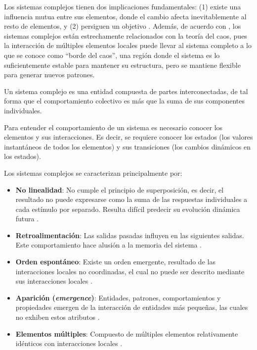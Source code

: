 Los sistemas complejos tienen dos implicaciones fundamentales: (1) existe una influencia mutua entre sus elementos, donde el cambio afecta inevitablemente al resto de elementos, y (2) persiguen un objetivo \cite{Zelinka2018_cs}. Además, de acuerdo con \cite{sole1996_cs_caos}, los sistemas complejos están estrechamente relacionados con la teoría del caos, pues la interacción de múltiples elementos locales puede llevar al sistema completo a lo que se conoce como ``borde del caos'', una región donde el sistema es lo suficientemente estable para mantener su estructura, pero se mantiene flexible para generar nuevos patrones.

\begin{definition}
	Un sistema complejo es una entidad compuesta de partes interconectadas, de tal forma que el comportamiento colectivo es más que la suma de sus componentes individuales.
\end{definition}

Para entender el comportamiento de un sistema es necesario conocer los elementos y sus interacciones. Es decir, se requiere conocer los estados (los valores instantáneos de todos los elementos) y sus transiciones (los cambios dinámicos en los estados).

Los sistemas complejos se caracterizan principalmente por:

\begin{itemize}
	
	\item \textbf{No linealidad}: No cumple el principio de superposición, es decir, el resultado no puede expresarse como la suma de las respuestas individuales a cada estímulo por separado. Resulta difícil predecir su evolución dinámica futura \cite{Zelinka2018_cs, Moriello2003_cs}.

	\item \textbf{Retroalimentación}: Las salidas pasadas influyen en las siguientes salidas. Este comportamiento hace alusión a la memoria del sistema \cite{Moriello2003_cs}. 
	
	\item \textbf{Orden espontáneo}: Existe un orden emergente, resultado de las interacciones locales no coordinadas, el cual no puede ser descrito mediante sus interacciones locales \cite{Moriello2003_cs}.
	
	\item \textbf{Aparición (\textit{emergence})}: Entidades, patrones, comportamientos y propiedades emergen de la interacción de entidades más pequeñas, las cuales no exhiben estos atributos \cite{Moriello2003_cs}.
	
	\item \textbf{Elementos múltiples}: Compuesto de múltiples elementos relativamente idénticos con interacciones locales \cite{Zelinka2018_cs}. 
\end{itemize}

